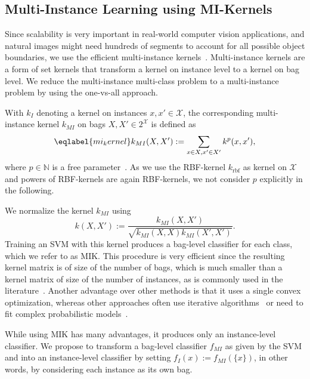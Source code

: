 \subsection{Multi-Instance Learning using MI-Kernels}
Since scalability is very important in real-world computer vision applications,
and natural images might need hundreds of segments to account for all possible
object boundaries, we use the efficient multi-instance
kernels~\citep{gaertner2002multi}.  Multi-instance kernels are a form of set
kernels %
 that transform a kernel on instance level to a kernel on bag level.  We
reduce the multi-instance multi-class problem to a multi-instance problem by
using the one-vs-all approach.

With $k_I$ denoting a kernel on instances $x,x' \in \mathcal{X}$, the
corresponding multi-instance kernel $k_{MI}$ on bags $X,X' \in 2^\mathcal{X}$
is defined as
\begin{equation}\eqlabel{mi_kernel}
k_{MI}(X,X') := \sum_{x \in X, x' \in X'} k^p(x,x'),
\end{equation}
where $p \in \mathbb{N}$ is a free parameter~\citep{gaertner2002multi}. As we use
the RBF-kernel $k_{\text{rbf}}$ as kernel on $\mathcal{X}$ and powers of RBF-kernels
are again RBF-kernels, we not consider $p$ explicitly in the following.

We normalize the kernel $k_{MI}$ \citep{gaertner2002multi} using
\begin{equation}
k(X,X') := \frac{k_{MI}(X,X')}{\sqrt{k_{MI}(X,X)k_{MI}(X',X')}}.
\end{equation}
Training an SVM with this kernel produces a bag-level classifier for each
class, which we refer to as MIK\@.  This procedure is very efficient since
the resulting kernel matrix is of size of the number of bags, which is much smaller
than a kernel matrix of size of the number of instances, as is commonly used in the
literature~\citep{andrews2003support,nguyen2010new,zhang2008m3miml}.  Another
advantage over other methods is that it uses a single convex optimization,
whereas other approaches often use iterative
algorithms~\citep{andrews2003support} or need to fit complex probabilistic
models~\citep{zha2008joint}.

While using MIK has many advantages, it produces only an instance-level
classifier. We propose to transform a bag-level classifier $f_{MI}$ as given by
the SVM and  into an instance-level classifier by setting
$f_{I}(x):=f_{MI}(\{x\})$, in other words, by considering each instance as its own
bag. 

